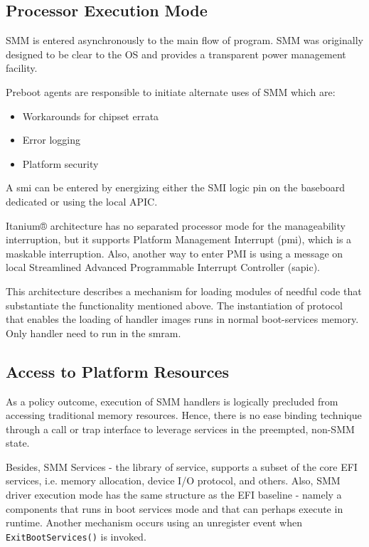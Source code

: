 \subsection{Processor Execution Mode}\label{subsection-processor-execution-mode}
SMM is entered asynchronously to the main flow of program. SMM was originally designed to be clear to the OS and provides a transparent power management facility. 

Preboot agents are responsible to initiate alternate uses of SMM which are:
\begin{itemize}
	\item Workarounds for chipset errata
	\item Error logging
	\item Platform security
\end{itemize}

A \gls{smi} can be entered by energizing either the SMI logic pin on the baseboard dedicated or using the local APIC.

Itanium® architecture has no separated processor mode for the manageability interruption, but it supports Platform Management Interrupt (\gls{pmi}), which is a maskable interruption. Also, another way to enter PMI is using a message on local Streamlined Advanced Programmable Interrupt Controller (\gls{sapic}).

This architecture describes a mechanism for loading modules of needful code that substantiate the functionality mentioned above. The instantiation of protocol that enables the loading of handler images runs in normal boot-services memory. Only handler need to run in the \gls{smram}.

\subsection{Access to Platform Resources}\label{subsection-access-to-platform-resources}
As a policy outcome, execution of SMM handlers is logically precluded from accessing traditional memory resources. Hence, there is no ease binding technique through a call or trap interface to leverage services in the preempted, non-SMM state.

Besides, SMM Services - the library of service, supports a subset of the core EFI services, i.e. memory allocation, device I/O protocol, and others. Also, SMM driver execution mode has the same structure as the EFI baseline - namely a components that runs in boot services mode and that can perhaps execute in runtime. Another mechanism occurs using an unregister event when \verb|ExitBootServices()| is invoked.



